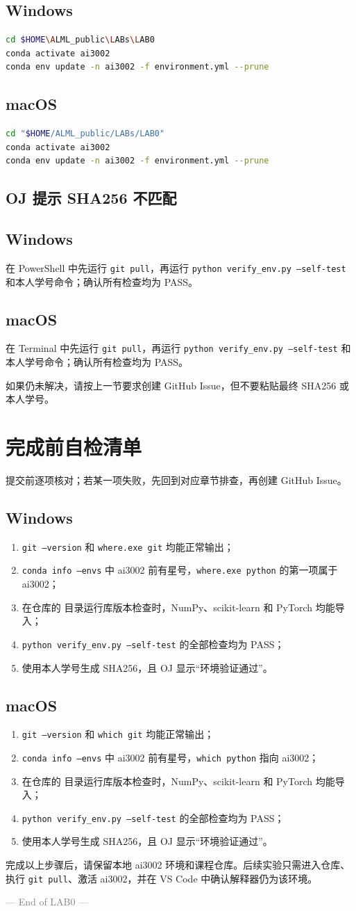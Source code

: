 \documentclass[11pt,a4paper]{article}
\newcommand{\windows}{\subsection*{\textcolor{windowsblue}{Windows}}}
\newcommand{\macos}{\subsection*{\textcolor{macgray}{macOS}}}
\begin{document}
\windows

\begin{lstlisting}[language=bash]
cd $HOME\ALML_public\LABs\LAB0
conda activate ai3002
conda env update -n ai3002 -f environment.yml --prune
\end{lstlisting}

\macos

\begin{lstlisting}[language=bash]
cd "$HOME/ALML_public/LABs/LAB0"
conda activate ai3002
conda env update -n ai3002 -f environment.yml --prune
\end{lstlisting}

\subsection*{OJ 提示 SHA256 不匹配}

\windows
在 PowerShell 中先运行 \texttt{git pull}，再运行 \texttt{python verify\_env.py --self-test} 和本人学号命令；确认所有检查均为 PASS。

\macos
在 Terminal 中先运行 \texttt{git pull}，再运行 \texttt{python verify\_env.py --self-test} 和本人学号命令；确认所有检查均为 PASS。

如果仍未解决，请按上一节要求创建 GitHub Issue，但不要粘贴最终 SHA256 或本人学号。

\section{完成前自检清单}

提交前逐项核对；若某一项失败，先回到对应章节排查，再创建 GitHub Issue。

\windows

\begin{enumerate}
  \item \texttt{git --version} 和 \texttt{where.exe git} 均能正常输出；
  \item \texttt{conda info --envs} 中 ai3002 前有星号，\texttt{where.exe python} 的第一项属于 ai3002；
  \item 在仓库的  目录运行库版本检查时，NumPy、scikit-learn 和 PyTorch 均能导入；
  \item \texttt{python verify\_env.py --self-test} 的全部检查均为 PASS；
  \item 使用本人学号生成 SHA256，且 OJ 显示“环境验证通过”。
\end{enumerate}

\macos

\begin{enumerate}
  \item \texttt{git --version} 和 \texttt{which git} 均能正常输出；
  \item \texttt{conda info --envs} 中 ai3002 前有星号，\texttt{which python} 指向 ai3002；
  \item 在仓库的  目录运行库版本检查时，NumPy、scikit-learn 和 PyTorch 均能导入；
  \item \texttt{python verify\_env.py --self-test} 的全部检查均为 PASS；
  \item 使用本人学号生成 SHA256，且 OJ 显示“环境验证通过”。
\end{enumerate}

完成以上步骤后，请保留本地 ai3002 环境和课程仓库。后续实验只需进入仓库、执行 \texttt{git pull}、激活 ai3002，并在 VS Code 中确认解释器仍为该环境。

\vfill
\begin{center}
  \textcolor{gray}{--- End of LAB0 ---}
\end{center}
\end{document}

